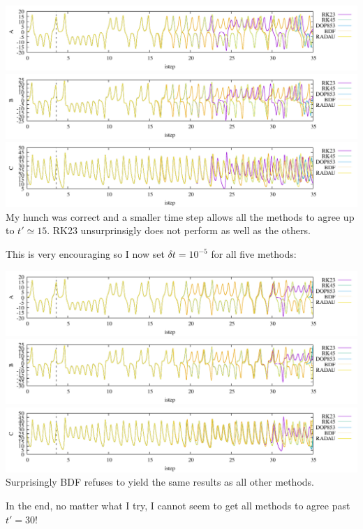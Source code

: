 \begin{center}
\includegraphics[width=16cm]{python_codes/fieldstone_156/blog/A4.pdf}\\
\includegraphics[width=16cm]{python_codes/fieldstone_156/blog/B4.pdf}\\
\includegraphics[width=16cm]{python_codes/fieldstone_156/blog/C4.pdf}\\
{\captionfont My hunch was correct and a smaller time step allows 
all the methods to agree up to $t'\simeq 15$.
RK23 unsurprinsigly does not perform as well as the others.}
\end{center}

This is very encouraging so I now set $\delta t=10^{-5}$ for all five methods:

\begin{center}
\includegraphics[width=16cm]{python_codes/fieldstone_156/blog/A5.pdf}\\
\includegraphics[width=16cm]{python_codes/fieldstone_156/blog/B5.pdf}\\
\includegraphics[width=16cm]{python_codes/fieldstone_156/blog/C5.pdf}\\
{\captionfont Surprisingly BDF refuses to yield the same results as all 
other methods.}
\end{center}
In the end, no matter what I try, I cannot seem to get all methods to agree past $t'=30$! 

